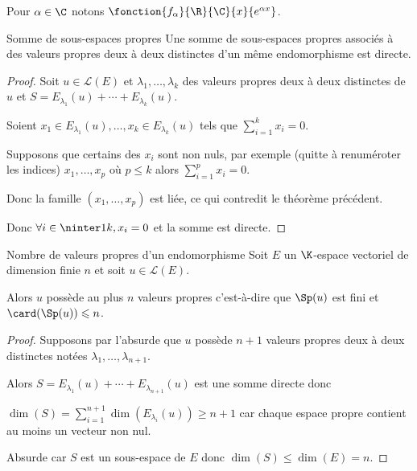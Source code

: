 \begin{exemple}
    Pour $\alpha \in \C$ notons $\fonction{f_\alpha}{\R}{\C}{x}{e^{\alpha x}}$.
\end{exemple}

\begin{theoreme}{Somme de sous-espaces propres}{}
    Une somme de sous-espaces propres associés à des valeurs propres deux à deux distinctes 
    d'un même endomorphisme est directe. 
\end{theoreme}


\begin{proof}
    Soit $u \in \mathscr L(E)$ et $\lambda_1, \ldots, \lambda_k$ des valeurs propres deux à deux distinctes de $u$
    et $S = E_{\lambda_1}(u) + \cdots + E_{\lambda_k}(u)$.

    Soient $x_1 \in E_{\lambda_1}(u), \ldots, x_k \in E_{\lambda_k}(u)$ tels que
    $\displaystyle \sum_{i = 1}^k x_i = 0$.

    Supposons que certains des $x_i$ sont non nuls, par exemple (quitte à renuméroter les indices)
    $x_1, \dots, x_p$ où $p \leqslant k$ alors $\displaystyle \sum_{i = 1}^p x_i = 0$.

    Donc la famille $(x_1, \ldots, x_p)$ est liée, ce qui contredit le théorème précédent. 

    Donc $\forall i \in \ninter 1 k, x_i = 0$ et la somme est directe.
\end{proof}

\begin{theoreme}{Nombre de valeurs propres d'un endomorphisme}{}
    Soit $E$ un $\K$-espace vectoriel de dimension finie $n$ et soit $u \in \mathscr L(E)$.

    Alors $u$ possède au plus $n$ valeurs propres c'est-à-dire que $\Sp(u)$ est fini et 
    $\card(\Sp(u)) \leqslant n$.
\end{theoreme}


\begin{proof}
    Supposons par l'absurde que $u$ possède $n + 1$ valeurs propres deux à deux distinctes
    notées $\lambda_1, \ldots, \lambda_{n + 1}$.

    Alors $S = E_{\lambda_1}(u) + \cdots + E_{\lambda_{n + 1}}(u)$ est une somme directe
    donc 
    
    $\displaystyle \dim(S) = \sum_{i = 1}^{n + 1} \dim(E_{\lambda_i}(u)) \geqslant n + 1$ car
    chaque espace propre contient au moins un vecteur non nul.

    Absurde car $S$ est un sous-espace de $E$ donc $\dim(S) \leqslant \dim(E) = n$.
\end{proof}

